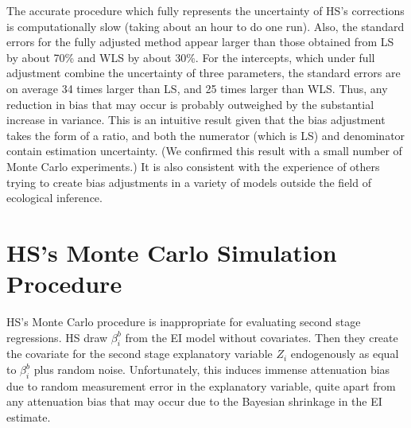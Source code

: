 \documentclass[11pt,titlepage]{article}
\begin{document}
The accurate procedure which fully represents the uncertainty of HS's
corrections is computationally slow (taking about an hour to do one
run).  Also, the standard errors for the fully adjusted method appear
larger than those obtained from LS by about 70\% and WLS by about
30\%.  For the intercepts, which under full adjustment combine the
uncertainty of three parameters, the standard errors are on average 34
times larger than LS, and 25 times larger than WLS.  Thus, any
reduction in bias that may occur is probably outweighed by the
substantial increase in variance.  This is an intuitive result given
that the bias adjustment takes the form of a ratio, and both the
numerator (which is LS) and denominator contain estimation
uncertainty.  (We confirmed this result with a small number of Monte
Carlo experiments.)  It is also consistent with the experience of
others trying to create bias adjustments in a variety of models
outside the field of ecological inference.

\section{HS's Monte Carlo Simulation Procedure}

HS's Monte Carlo procedure is inappropriate for evaluating second stage
regressions.  HS draw $\beta_i^b$ from the EI model without
covariates.  Then they create the covariate for the second stage
explanatory variable $Z_i$ endogenously as equal to $\beta_i^b$ plus
random noise.  Unfortunately, this induces immense attenuation bias
due to random measurement error in the explanatory variable, quite
apart from any attenuation bias that may occur due to the Bayesian
shrinkage in the EI estimate.
\end{document}

